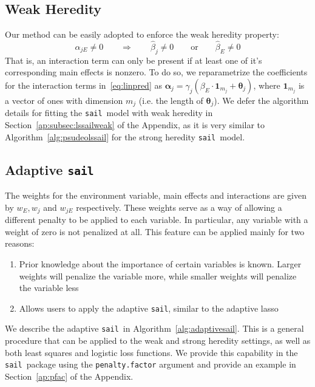 \documentclass[12pt,letter]{article}\usepackage[]{graphicx}\usepackage[]{color}
\newcommand{\sail}{\texttt{sail}}
\newcommand{\tm}[1]{\textrm{{#1}}}
\newcommand{\balpha}{\boldsymbol{\alpha}}
\newcommand{\mb}[1]{\mathbf{#1}}
\newcommand{\btheta}{\boldsymbol{\theta}}
\begin{document}
\subsection{Weak Heredity}
Our method can be easily adopted to enforce the weak heredity property:
\begin{equation}
	\hat{\alpha}_{jE} \neq 0 \qquad \Rightarrow \qquad \hat{\beta}_j \neq 0 \qquad \tm{or} \qquad \hat{\beta}_E \neq 0   \label{eq:heredity2} \nonumber
\end{equation}
That is, an interaction term can only be present if at least one of it's corresponding main effects is nonzero. To do so, we reparametrize the coefficients for the interaction terms in~\eqref{eq:linpred} as $\balpha_{j} = \gamma_{j}  (\beta_E \cdot \mb{1}_{m_j} + \btheta_j)$, where $\mb{1}_{m_j}$ is a vector of ones with dimension $m_j$ (i.e. the length of $\btheta_j$). We defer the algorithm details for fitting the \sail ~model with weak heredity in Section~\ref{ap:subsec:lssailweak} of the Appendix, as it is very similar to Algorithm~\ref{alg:psudeolssail} for the strong heredity \sail ~model. 


\subsection{Adaptive \sail}

The weights for the environment variable, main effects and interactions are given by $w_E, w_j$ and $w_{jE}$ respectively. These weights serve as a way of allowing a different penalty to be applied to each variable. In particular, any variable with a weight of zero is not penalized at all. This feature can be applied mainly for two reasons:  

\begin{enumerate}
	\item Prior knowledge about the importance of certain variables is known. Larger weights will penalize the variable more, while smaller weights will penalize the variable less  
	\item Allows users to apply the adaptive \sail, similar to the adaptive lasso~\citep{zou2006adaptive}
\end{enumerate}  

We describe the adaptive \sail ~in Algorithm~\ref{alg:adaptivesail}. This is a general procedure that can be applied to the weak and strong heredity settings, as well as both least squares and logistic loss functions. We provide this capability in the \sail ~package using the \texttt{penalty.factor} argument and provide an example in Section~\ref{ap:pfac} of the Appendix.
\end{document}
